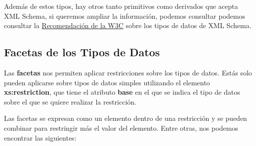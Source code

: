 Además de estos tipos, hay otros tanto primitivos como derivados que acepta XML Schema, si queremos ampliar la información, podemos consultar podemos consultar la \href{https://www.w3.org/TR/xmlschema-2/}{Recomendación de la W3C} sobre los tipos de datos de XML Schema.

\subsection{Facetas de los Tipos de Datos}
Las \textbf{facetas} nos permiten aplicar restricciones sobre los tipos de datos. Estás solo pueden aplicarse sobre tipos de datos simples utilizando el elemento \textbf{xs:restriction}, que tiene el atributo \textbf{base} en el que se indica el tipo de datos sobre el que se quiere realizar la restricción.

Las facetas se expresan como un elemento dentro de una restricción y se pueden combinar para restringir más el valor del elemento. Entre otras, nos podemos encontrar las siguientes:

